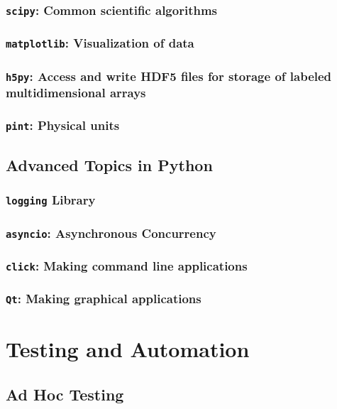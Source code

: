 \subsubsection{\texttt{scipy}: Common scientific algorithms}
\subsubsection{\texttt{matplotlib}: Visualization of data}
\subsubsection{\texttt{h5py}: Access and write HDF5 files for storage of labeled multidimensional arrays}
\subsubsection{\texttt{pint}: Physical units}

\subsection{Advanced Topics in Python}

\subsubsection{\texttt{logging} Library}
\subsubsection{\texttt{asyncio}: Asynchronous Concurrency}
\subsubsection{\texttt{click}: Making command line applications}
\subsubsection{\texttt{Qt}: Making graphical applications}


\section{Testing and Automation}  %

\subsection{Ad Hoc Testing}

